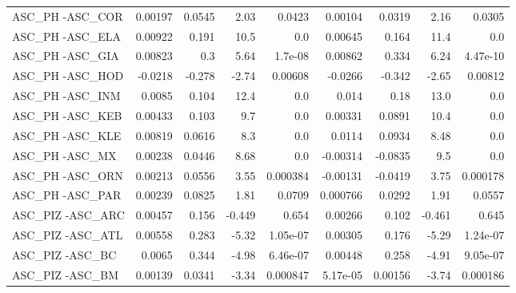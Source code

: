 \begin{tabular}{lrrrrrrrr}
ASC\_PH -ASC\_COR                         &     0.00197 &       0.0545 &    2.03 &   0.0423 &    0.00104 &      0.0319 &         2.16 &        0.0305 \\
ASC\_PH -ASC\_ELA                         &     0.00922 &        0.191 &    10.5 &      0.0 &    0.00645 &       0.164 &         11.4 &           0.0 \\
ASC\_PH -ASC\_GIA                         &     0.00823 &          0.3 &    5.64 &  1.7e-08 &    0.00862 &       0.334 &         6.24 &      4.47e-10 \\
ASC\_PH -ASC\_HOD                         &     -0.0218 &       -0.278 &   -2.74 &  0.00608 &    -0.0266 &      -0.342 &        -2.65 &       0.00812 \\
ASC\_PH -ASC\_INM                         &      0.0085 &        0.104 &    12.4 &      0.0 &      0.014 &        0.18 &         13.0 &           0.0 \\
ASC\_PH -ASC\_KEB                         &     0.00433 &        0.103 &     9.7 &      0.0 &    0.00331 &      0.0891 &         10.4 &           0.0 \\
ASC\_PH -ASC\_KLE                         &     0.00819 &       0.0616 &     8.3 &      0.0 &     0.0114 &      0.0934 &         8.48 &           0.0 \\
ASC\_PH -ASC\_MX                          &     0.00238 &       0.0446 &    8.68 &      0.0 &   -0.00314 &     -0.0835 &          9.5 &           0.0 \\
ASC\_PH -ASC\_ORN                         &     0.00213 &       0.0556 &    3.55 & 0.000384 &   -0.00131 &     -0.0419 &         3.75 &      0.000178 \\
ASC\_PH -ASC\_PAR                         &     0.00239 &       0.0825 &    1.81 &   0.0709 &   0.000766 &      0.0292 &         1.91 &        0.0557 \\
ASC\_PIZ -ASC\_ARC                        &     0.00457 &        0.156 &  -0.449 &    0.654 &    0.00266 &       0.102 &       -0.461 &         0.645 \\
ASC\_PIZ -ASC\_ATL                        &     0.00558 &        0.283 &   -5.32 & 1.05e-07 &    0.00305 &       0.176 &        -5.29 &      1.24e-07 \\
ASC\_PIZ -ASC\_BC                         &      0.0065 &        0.344 &   -4.98 & 6.46e-07 &    0.00448 &       0.258 &        -4.91 &      9.05e-07 \\
ASC\_PIZ -ASC\_BM                         &     0.00139 &       0.0341 &   -3.34 & 0.000847 &   5.17e-05 &     0.00156 &        -3.74 &      0.000186 \\

\end{tabular}
